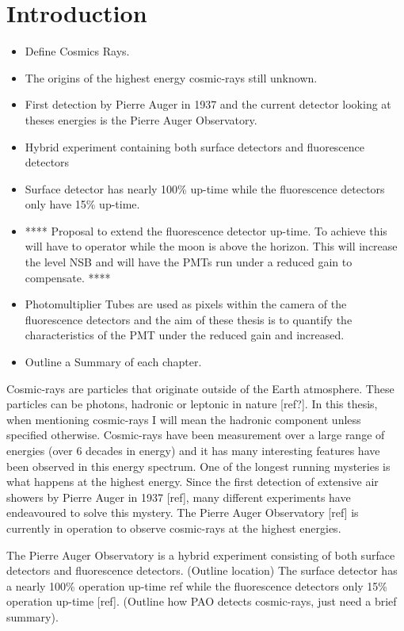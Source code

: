 \chapter*{\centering Introduction \\}\label{Ch:Intro}

\begin{itemize}
\item Define Cosmics Rays.
\item The origins of the highest energy cosmic-rays still unknown.
\item First detection by Pierre Auger in 1937 and the current detector looking at theses energies is the Pierre Auger Observatory.
\item Hybrid experiment containing both surface detectors and fluorescence detectors
\item Surface detector has nearly 100\% up-time while the fluorescence detectors only have 15\% up-time.
\item **** Proposal to extend the fluorescence detector up-time. To achieve this will have to operator while the moon is above the horizon. This will increase the level NSB and will have the PMTs run under a reduced gain to compensate. ****
\item Photomultiplier Tubes are used as pixels within the camera of the fluorescence detectors and  the aim of these thesis is to quantify the characteristics of the PMT under the reduced gain and increased.
\item Outline a Summary of each chapter.
\end{itemize}


Cosmic-rays are particles that originate outside of the Earth atmosphere. These particles can be photons, hadronic or leptonic in nature [ref?]. In this thesis, when mentioning cosmic-rays I will mean the hadronic component unless specified otherwise. Cosmic-rays have been measurement over a large range of energies (over 6 decades in energy) and it has many interesting features have been observed in this energy spectrum. One of the longest running mysteries is what happens at the highest energy. Since the first detection of extensive air showers by Pierre Auger in 1937 [ref], many different experiments have endeavoured to solve this mystery. The Pierre Auger Observatory [ref] is currently in operation to observe cosmic-rays at the highest energies. 

The Pierre Auger Observatory is a hybrid experiment consisting of both surface detectors and fluorescence detectors. (Outline location) The surface detector has a nearly 100\% operation up-time {ref} while the fluorescence detectors only 15\% operation up-time [ref]. (Outline how PAO detects cosmic-rays, just need a brief summary).

